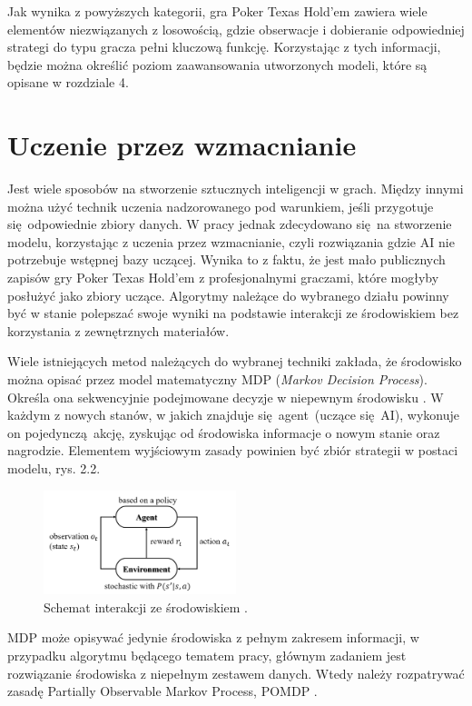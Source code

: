 \documentclass[12pt,oneside,a4paper]{report}
\begin{document}
Jak wynika z powyższych kategorii, gra Poker Texas Hold'em zawiera wiele elementów niezwiązanych z
losowością, gdzie obserwacje i dobieranie odpowiedniej strategi do typu gracza pełni kluczową
funkcję. Korzystając z tych informacji, będzie można określić poziom  zaawansowania utworzonych modeli, które
są opisane w rozdziale 4.

\section{Uczenie przez wzmacnianie}

Jest wiele sposobów na stworzenie sztucznych inteligencji w grach. Między innymi można użyć technik 
uczenia
nadzorowanego pod warunkiem, jeśli przygotuje się odpowiednie zbiory danych. W pracy jednak
zdecydowano się na stworzenie modelu, korzystając z uczenia przez wzmacnianie, czyli rozwiązania gdzie
AI nie potrzebuje wstępnej bazy uczącej. Wynika to z faktu, że jest mało publicznych zapisów
gry Poker Texas Hold'em z profesjonalnymi graczami, które mogłyby posłużyć jako zbiory uczące.
Algorytmy należące do
wybranego działu powinny być w stanie polepszać swoje wyniki na podstawie interakcji ze
środowiskiem bez korzystania z zewnętrznych materiałów.  


Wiele istniejących metod należących do wybranej techniki zakłada, że środowisko można opisać
przez model
matematyczny
MDP (\emph{Markov Decision Process}). 
Określa ona sekwencyjnie podejmowane decyzje w niepewnym środowisku \cite{mdp}. W każdym z nowych
stanów, w
jakich znajduje się agent (uczące się AI), wykonuje on pojedynczą akcję, zyskując od środowiska informacje o nowym stanie
oraz nagrodzie. Elementem wyjściowym zasady powinien być
zbiór strategii w postaci modelu, rys. 2.2.


\begin{figure}[th!]
            \center
           \includegraphics[width=0.5\textwidth]{./img/MDP.png}
           \caption{Schemat interakcji ze środowiskiem \cite{mdp}.}
\end{figure}


MDP może opisywać jedynie środowiska z pełnym zakresem informacji, w przypadku algorytmu będącego
tematem pracy, głównym zadaniem jest rozwiązanie środowiska z niepełnym zestawem danych. Wtedy 
należy rozpatrywać zasadę Partially Observable Markov Process, POMDP \cite{mdp}.
\end{document}
